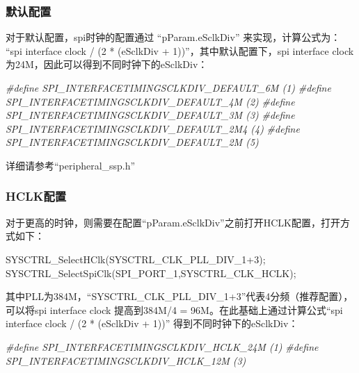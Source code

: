 \documentclass[
  12pt,
]{book}
\newenvironment{Shaded}{\begin{snugshade}}{\end{snugshade}}
\newcommand{\DecValTok}[1]{\textcolor[rgb]{0.00,0.00,0.81}{#1}}
\newcommand{\NormalTok}[1]{#1}
\newcommand{\PreprocessorTok}[1]{\textcolor[rgb]{0.56,0.35,0.01}{\textit{#1}}}
\begin{document}
\hypertarget{ux9ed8ux8ba4ux914dux7f6e}{%
\subsubsection{默认配置}\label{ux9ed8ux8ba4ux914dux7f6e}}

对于默认配置，spi时钟的配置通过 ``pParam.eSclkDiv'' 来实现，计算公式为： ``spi interface clock / (2 * (eSclkDiv + 1))''，其中默认配置下，spi interface clock 为24M，因此可以得到不同时钟下的eSclkDiv：

\begin{Shaded}
\begin{Highlighting}[]
\PreprocessorTok{#define SPI_INTERFACETIMINGSCLKDIV_DEFAULT_6M    (1)}
\PreprocessorTok{#define SPI_INTERFACETIMINGSCLKDIV_DEFAULT_4M    (2)}
\PreprocessorTok{#define SPI_INTERFACETIMINGSCLKDIV_DEFAULT_3M    (3)}
\PreprocessorTok{#define SPI_INTERFACETIMINGSCLKDIV_DEFAULT_2M4   (4)}
\PreprocessorTok{#define SPI_INTERFACETIMINGSCLKDIV_DEFAULT_2M    (5)}
\end{Highlighting}
\end{Shaded}

详细请参考``peripheral\_ssp.h''

\hypertarget{hclkux914dux7f6e}{%
\subsubsection{HCLK配置}\label{hclkux914dux7f6e}}

对于更高的时钟，则需要在配置``pParam.eSclkDiv''之前打开HCLK配置，打开方式如下：

\begin{Shaded}
\begin{Highlighting}[]
\NormalTok{    SYSCTRL_SelectHClk(SYSCTRL_CLK_PLL_DIV_1+}\DecValTok{3}\NormalTok{);}
\NormalTok{    SYSCTRL_SelectSpiClk(SPI_PORT_1,SYSCTRL_CLK_HCLK);}
\end{Highlighting}
\end{Shaded}

其中PLL为384M，``SYSCTRL\_CLK\_PLL\_DIV\_1+3''代表4分频（推荐配置），可以将spi interface clock 提高到384M/4 = 96M。在此基础上通过计算公式``spi interface clock / (2 * (eSclkDiv + 1))'' 得到不同时钟下的eSclkDiv：

\begin{Shaded}
\begin{Highlighting}[]
\PreprocessorTok{#define SPI_INTERFACETIMINGSCLKDIV_HCLK_24M    (1)}
\PreprocessorTok{#define SPI_INTERFACETIMINGSCLKDIV_HCLK_12M    (3)}
\end{Highlighting}
\end{Shaded}
\end{document}
